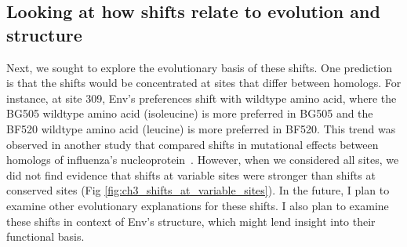 \documentclass[9pt]{elife}
\begin{document}
\subsection*{Looking at how shifts relate to evolution and structure}

Next, we sought to explore the evolutionary basis of these shifts.
One prediction is that the shifts would be concentrated at sites that differ between homologs.
For instance, at site 309, Env's preferences shift with wildtype amino acid, where the BG505 wildtype amino acid (isoleucine) is more preferred in BG505 and the BF520 wildtype amino acid (leucine) is more preferred in BF520.
This trend was observed in another study that compared shifts in mutational effects between homologs of influenza's nucleoprotein~\cite{doud2015site}.
However, when we considered all sites, we did not find evidence that shifts at variable sites were stronger than shifts at conserved sites (Fig \ref{fig:ch3_shifts_at_variable_sites}).
In the future, I plan to examine other evolutionary explanations for these shifts.
I also plan to examine these shifts in context of Env's structure, which might lend insight into their functional basis.
\end{document}

